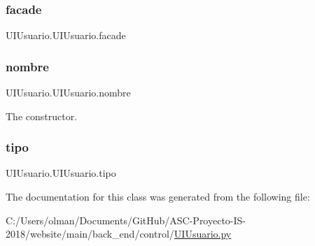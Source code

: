 \subsubsection{\texorpdfstring{facade}{facade}}
{\footnotesize\ttfamily U\+I\+Usuario.\+U\+I\+Usuario.\+facade}

\mbox{\label{class_u_i_usuario_1_1_u_i_usuario_a0a907891ebfe5679bbab53bf18e03b32}} 
\subsubsection{\texorpdfstring{nombre}{nombre}}
{\footnotesize\ttfamily U\+I\+Usuario.\+U\+I\+Usuario.\+nombre}



The constructor. 

\mbox{\label{class_u_i_usuario_1_1_u_i_usuario_a8978cc3071fdc4a58afd844f4b25b689}} 
\subsubsection{\texorpdfstring{tipo}{tipo}}
{\footnotesize\ttfamily U\+I\+Usuario.\+U\+I\+Usuario.\+tipo}



The documentation for this class was generated from the following file\+:\begin{DoxyCompactItemize}
\item 
C\+:/\+Users/olman/\+Documents/\+Git\+Hub/\+A\+S\+C-\/\+Proyecto-\/\+I\+S-\/2018/website/main/back\+\_\+end/control/\mbox{\hyperlink{_u_i_usuario_8py}{U\+I\+Usuario.\+py}}\end{DoxyCompactItemize}
